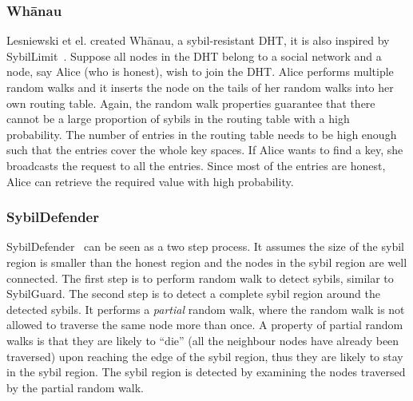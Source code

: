 \subsubsection{Wh\={a}nau}
Lesniewski et el. created Wh\={a}nau, a sybil-resistant DHT, it is also inspired
by SybilLimit~\cite{lesniewski2008sybil, lesniewski2010whanau}. Suppose all nodes
in the DHT belong to a social network and a node, say Alice (who is honest),
wish to join the DHT. Alice performs multiple random walks and it inserts the
node on the tails of her random walks into her own routing table. Again, the
random walk properties guarantee that there cannot be a large proportion of
sybils in the routing table with a high probability. The number of entries in
the routing table needs to be high enough such that the entries cover the whole
key spaces. If Alice wants to find a key, she broadcasts the request to all the
entries. Since most of the entries are honest, Alice can retrieve the required
value with high probability.

\subsubsection{SybilDefender}
SybilDefender~\cite{wei2012sybildefender} can be seen as a two step process. It
assumes the size of the sybil region is smaller than the honest region and the
nodes in the sybil region are well connected. The first step is to perform
random walk to detect sybils, similar to SybilGuard. The second step is to
detect a complete sybil region around the detected sybils. It performs a
\emph{partial} random walk, where the random walk is not allowed to traverse the
same node more than once. A property of partial random walks is that they are
likely to ``die'' (all the neighbour nodes have already been traversed) upon
reaching the edge of the sybil region, thus they are likely to stay in the sybil
region. The sybil region is detected by examining the nodes traversed by the
partial random walk.


